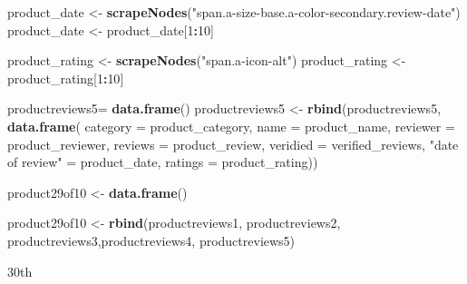 \documentclass[
]{article}
\newenvironment{Shaded}{\begin{snugshade}}{\end{snugshade}}
\newcommand{\AttributeTok}[1]{\textcolor[rgb]{0.13,0.29,0.53}{#1}}
\newcommand{\DecValTok}[1]{\textcolor[rgb]{0.00,0.00,0.81}{#1}}
\newcommand{\FunctionTok}[1]{\textcolor[rgb]{0.13,0.29,0.53}{\textbf{#1}}}
\newcommand{\NormalTok}[1]{#1}
\newcommand{\OtherTok}[1]{\textcolor[rgb]{0.56,0.35,0.01}{#1}}
\newcommand{\SpecialCharTok}[1]{\textcolor[rgb]{0.81,0.36,0.00}{\textbf{#1}}}
\newcommand{\StringTok}[1]{\textcolor[rgb]{0.31,0.60,0.02}{#1}}
\begin{document}
\begin{Shaded}
\begin{Highlighting}[]
\NormalTok{  product\_date }\OtherTok{\textless{}{-}} \FunctionTok{scrapeNodes}\NormalTok{(}\StringTok{"span.a{-}size{-}base.a{-}color{-}secondary.review{-}date"}\NormalTok{)}
\NormalTok{  product\_date }\OtherTok{\textless{}{-}}\NormalTok{ product\_date[}\DecValTok{1}\SpecialCharTok{:}\DecValTok{10}\NormalTok{]}
  
\NormalTok{  product\_rating }\OtherTok{\textless{}{-}} \FunctionTok{scrapeNodes}\NormalTok{(}\StringTok{"span.a{-}icon{-}alt"}\NormalTok{)}
\NormalTok{  product\_rating }\OtherTok{\textless{}{-}}\NormalTok{ product\_rating[}\DecValTok{1}\SpecialCharTok{:}\DecValTok{10}\NormalTok{]}
  
\NormalTok{  productreviews5}\OtherTok{=} \FunctionTok{data.frame}\NormalTok{()}
\NormalTok{  productreviews5 }\OtherTok{\textless{}{-}} \FunctionTok{rbind}\NormalTok{(productreviews5, }\FunctionTok{data.frame}\NormalTok{(}
                      \AttributeTok{category =}\NormalTok{ product\_category,}
                      \AttributeTok{name =}\NormalTok{ product\_name,}
                      \AttributeTok{reviewer =}\NormalTok{ product\_reviewer,}
                      \AttributeTok{reviews =}\NormalTok{ product\_review,}
                      \AttributeTok{veridied =}\NormalTok{ verified\_reviews,}
                      \StringTok{"date of review"} \OtherTok{=}\NormalTok{ product\_date,}
                      \AttributeTok{ratings =}\NormalTok{ product\_rating))}
  
\NormalTok{  product29of10 }\OtherTok{\textless{}{-}} \FunctionTok{data.frame}\NormalTok{()}
  
\NormalTok{  product29of10 }\OtherTok{\textless{}{-}} \FunctionTok{rbind}\NormalTok{(productreviews1, productreviews2, productreviews3,productreviews4, productreviews5)}
\end{Highlighting}
\end{Shaded}

30th
\end{document}
